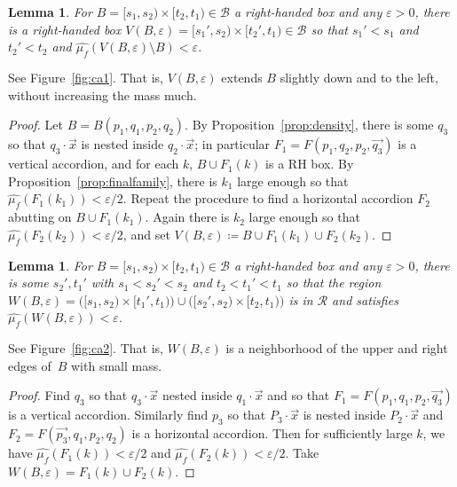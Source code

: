 \documentclass[11pt]{amsart}
\newcommand{\ora}[1]{\overrightarrow{#1}}
\numberwithin{equation}{section}
\numberwithin{figure}{section}
\newtheorem{lemma}[theorem]{Lemma}
\theoremstyle{definition}
\theoremstyle{plain}
\newcommand\cB{\ensuremath{\mathcal{B}}}
\newcommand*{\wh}[1]{\widehat{#1}}
\renewcommand{\epsilon}{\varepsilon}
\begin{document}
\begin{lemma}\label{lem:extend1}
  For $B = [s_1,s_2)\times [t_2,t_1) \in \cB$ a right-handed box and
  any $\epsilon > 0$, there is a right-handed box $V(B,\epsilon) =
  [s_1',s_2) \times [t_2',t_1) \in \cB$ so that
  $s_1' < s_1$ and $t_2' < t_2$ and
  $\wh{\mu_f}(V(B,\epsilon) \setminus B) < \epsilon$.
\end{lemma}
See Figure~\ref{fig:ca1}. That is, $V(B,\epsilon)$ extends $B$ slightly down and to the left,
without increasing the mass much.

\begin{proof}
  Let $B = B(p_1,q_1,p_2,q_2)$.
  By Proposition~\ref{prop:density}, there is some $q_3$ so that $q_3
  \cdot \ora{x}$ is nested inside $q_2 \cdot \ora{x}$; in particular
  $F_1 = F(p_1,q_2,p_2,\vec{q_3})$ is a vertical accordion, and for
  each $k$, $B \cup F_1(k)$ is a RH box. 
  By Proposition~\ref{prop:finalfamily}, there is $k_1$ large enough
  so that
  $\wh{\mu_f}(F_1(k_1))<\epsilon/2$.
  Repeat the procedure to find a horizontal
  accordion $F_2$ abutting on $B \cup F_1(k_1)$. Again there is $k_2$
  large enough so that $\wh{\mu_f}(F_2(k_2)) < \epsilon/2$, and set $V(B,\epsilon) \coloneqq B \cup F_1(k_1) \cup F_2(k_2)$.
\end{proof}

\begin{lemma}\label{lem:extend2}
  For $B = [s_1,s_2) \times [t_2,t_1) \in \cB$ a right-handed box and
  any $\epsilon > 0$, there is some $s_2',t_1'$ with
  $s_1 < s_2' < s_2$ and $t_2 < t_1' < t_1$ so that the region
  $W(B,\epsilon) = \bigl([s_1,s_2) \times [t_1',t_1)\bigr) \cup
  \bigl([s_2',s_2) \times [t_2,t_1)\bigr)$ is in $\mathcal{R}$ and satisfies
  $\wh{\mu_f}(W(B,\epsilon)) < \epsilon$.
\end{lemma}
See Figure~\ref{fig:ca2}. That is, $W(B,\epsilon)$ is a neighborhood of the upper and right
edges of~$B$ with small mass.

\begin{proof}
  Find $q_3$ so that $q_3 \cdot \ora{x}$ nested inside
  $q_1 \cdot \ora{x}$ and so that $F_1 = F(p_1,q_1,p_2,\vec{q_3})$ is a
  vertical accordion. Similarly find $p_3$ so that $P_3 \cdot \ora{x}$
  is nested inside $P_2 \cdot \ora{x}$ and
  $F_2 = F(\vec{p_3},q_1,p_2,q_2)$ is a horizontal accordion. Then
  for sufficiently large $k$, we have $\wh{\mu_f}(F_1(k)) < \epsilon/2$ and
  $\wh{\mu_f}(F_2(k)) < \epsilon/2$. Take
  $W(B,\epsilon) = F_1(k) \cup F_2(k)$.
\end{proof}
  
\end{document}
